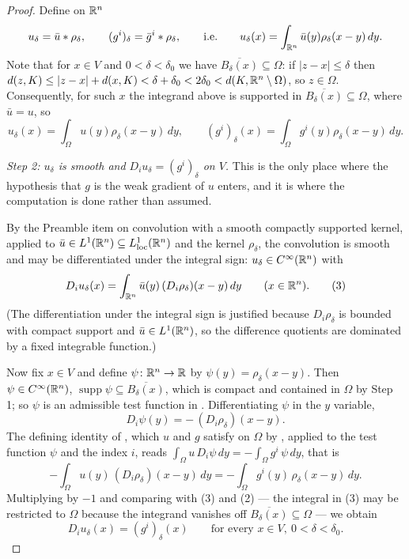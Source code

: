 \begin{proof}
Define on $\mathbb{R}^n$
\[
u_\delta=\bar u*\rho_\delta,\qquad
(g^i)_\delta=\bar g^i*\rho_\delta ,
\qquad\text{i.e.}\qquad
u_\delta(x)=\int_{\mathbb{R}^n}\bar u(y)\rho_\delta(x-y)\,dy .
\]
Note that for $x\in V$ and $0<\delta<\delta_0$ we have
$\overline{B_\delta(x)}\subseteq\Omega$: if $|z-x|\le\delta$ then
$d(z,K)\le|z-x|+d(x,K)<\delta+\delta_0<2\delta_0<d(K,\mathbb{R}^n\setminus\Omega)$, so
$z\in\Omega$.  Consequently, for such $x$ the integrand above is supported in
$\overline{B_\delta(x)}\subseteq\Omega$, where $\bar u=u$, so
\[
u_\delta(x)=\int_\Omega u(y)\rho_\delta(x-y)\,dy,
\qquad
(g^i)_\delta(x)=\int_\Omega g^i(y)\rho_\delta(x-y)\,dy .
\tag{2}
\]

\emph{Step 2: $u_\delta$ is smooth and $D_iu_\delta=(g^i)_\delta$ on $V$.}  This
is the only place where the hypothesis that $g$ is the weak gradient of $u$
enters, and it is where the computation is done rather than assumed.

By the Preamble item on convolution with a smooth compactly supported kernel,
applied to $\bar u\in L^1(\mathbb{R}^n)\subseteq L^1_{\mathrm{loc}}(\mathbb{R}^n)$ and the kernel
$\rho_\delta$, the convolution is smooth and may be differentiated under the
integral sign: $u_\delta\in C^\infty(\mathbb{R}^n)$ with
\[
D_iu_\delta(x)=\int_{\mathbb{R}^n}\bar u(y)\,(D_i\rho_\delta)(x-y)\,dy
\qquad(x\in\mathbb{R}^n).
\tag{3}
\]
(The differentiation under the integral sign is justified because
$D_i\rho_\delta$ is bounded with compact support and $\bar u\in L^1(\mathbb{R}^n)$, so
the difference quotients are dominated by a fixed integrable function.)

Now fix $x\in V$ and define $\psi\colon\mathbb{R}^n\to\mathbb{R}$ by
$\psi(y)=\rho_\delta(x-y)$.  Then $\psi\in C^\infty(\mathbb{R}^n)$,
$\operatorname{supp}\psi\subseteq\overline{B_\delta(x)}$, which is compact and
contained in $\Omega$ by Step 1; so $\psi$ is an admissible test function in
.  Differentiating $\psi$ in the $y$ variable,
\[
D_i\psi(y)=-\,(D_i\rho_\delta)(x-y) .
\]
The defining identity of , which $u$ and $g$ satisfy
on $\Omega$ by , applied to the test function $\psi$ and the
index $i$, reads $\int_\Omega u\,D_i\psi\,dy=-\int_\Omega g^i\,\psi\,dy$, that is
\[
-\int_\Omega u(y)\,(D_i\rho_\delta)(x-y)\,dy
=-\int_\Omega g^i(y)\,\rho_\delta(x-y)\,dy .
\]
Multiplying by $-1$ and comparing with (3) and (2) --- the integral in (3) may be
restricted to $\Omega$ because the integrand vanishes off
$\overline{B_\delta(x)}\subseteq\Omega$ --- we obtain
\[
D_iu_\delta(x)=(g^i)_\delta(x)\qquad\text{for every }x\in V,\ 0<\delta<\delta_0 .
\tag{4}
\]


\end{proof}
